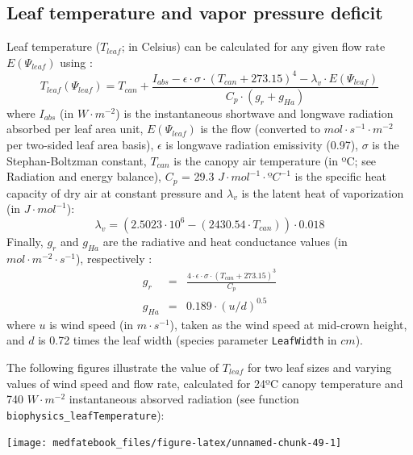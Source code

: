 \documentclass[]{book}
\begin{document}
\hypertarget{leaf-temperature-and-vapor-pressure-deficit}{%
\subsection{Leaf temperature and vapor pressure deficit}\label{leaf-temperature-and-vapor-pressure-deficit}}

Leaf temperature (\(T_{leaf}\); in Celsius) can be calculated for any given flow rate \(E(\Psi_{leaf})\) using \citep{Campbell1998}:
\begin{equation}
T_{leaf}(\Psi_{leaf}) = T_{can}+\frac{I_{abs}-\epsilon\cdot\sigma\cdot(T_{can}+273.15)^4-\lambda_v\cdot E(\Psi_{leaf})}{C_p\cdot(g_r+g_{Ha})}
\end{equation}
where \(I_{abs}\) (in \(W \cdot m^{-2}\)) is the instantaneous shortwave and longwave radiation absorbed per leaf area unit, \(E(\Psi_{leaf})\) is the flow (converted to \(mol \cdot s^{-1} \cdot m^{-2}\) per two-sided leaf area basis), \(\epsilon\) is longwave radiation emissivity (0.97), \(\sigma\) is the Stephan-Boltzman constant, \(T_{can}\) is the canopy air temperature (in ºC; see Radiation and energy balance), \(C_p\) = 29.3 \(J \cdot mol^{-1} \cdot ºC^{-1}\) is the specific heat capacity of dry air at constant pressure and \(\lambda_v\) is the latent heat of vaporization (in \(J \cdot mol^{-1}\)):
\begin{equation}
\lambda_v = (2.5023\cdot 10^6-(2430.54\cdot T_{can}))\cdot 0.018
\end{equation}
Finally, \(g_r\) and \(g_{Ha}\) are the radiative and heat conductance values (in \(mol \cdot m^{-2} \cdot s^{-1}\)), respectively \citep{Campbell1998}:
\begin{eqnarray}
g_r &=& \frac{4\cdot \epsilon \cdot \sigma \cdot (T_{can}+273.15)^3}{C_p} \\
g_{Ha} &=& 0.189 \cdot (u/d)^{0.5}
\end{eqnarray}
where \(u\) is wind speed (in \(m \cdot s^{-1}\)), taken as the wind speed at mid-crown height, and \(d\) is 0.72 times the leaf width (species parameter \texttt{LeafWidth} in \(cm\)).

The following figures illustrate the value of \(T_{leaf}\) for two leaf sizes and varying values of wind speed and flow rate, calculated for 24ºC canopy temperature and 740 \(W \cdot m^{-2}\) instantaneous absorved radiation (see function \texttt{biophysics\_leafTemperature}):

\begin{center}\texttt{[image: medfatebook\_files/figure-latex/unnamed-chunk-49-1]} \end{center}
\end{document}
